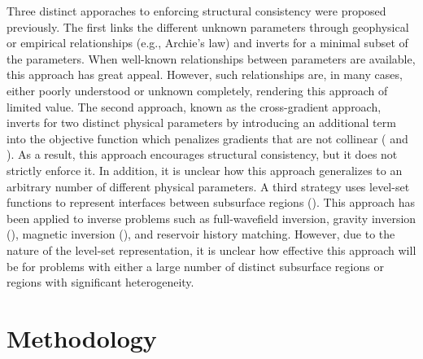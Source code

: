 \documentclass[manuscript,revised]{geophysics}
\begin{document}
Three distinct apporaches to enforcing structural consistency were proposed previously.  The first links the different unknown parameters through geophysical or empirical relationships (e.g., Archie’s law) and inverts for a minimal subset of the parameters. When well-known relationships between parameters are available, this approach has great appeal. However, such relationships are, in many cases, either poorly understood or unknown completely, rendering this approach of limited value.  The second approach, known as the cross-gradient approach, inverts for two distinct physical parameters by introducing an additional term into the objective function which penalizes gradients that are not collinear (\cite{Haber_1997} and \cite{Gallardo_2007}). As a result, this approach encourages structural consistency, but it does not strictly enforce it. In addition, it is unclear how this approach generalizes to an arbitrary number of different physical parameters. 
A third strategy uses level-set functions to represent interfaces between subsurface regions (\cite{Kadu_2016}). This approach has been applied to inverse problems such as full-wavefield inversion, gravity inversion (\cite{Li_2016}), magnetic inversion (\cite{Li_2017}), and reservoir history matching. However, due to the nature of the level-set representation, it is unclear how effective this approach will be for problems with either a large number of distinct subsurface regions or regions with significant heterogeneity. 

\section{Methodology}
\end{document}
